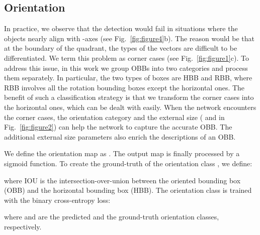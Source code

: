 \documentclass[10pt,twocolumn,letterpaper]{article}
\begin{document}
\subsection{Orientation}
\label{sub: orientation}
In practice, we observe that the detection would fail in situations where the objects nearly align with -axes (see Fig.~\ref{fig:figure4}b). The reason would be that at the boundary of the quadrant, the types of the vectors are difficult to be differentiated. We term this problem as corner cases (see Fig.~\ref{fig:figure1}c). To address this issue, in this work we group OBBs into two categories and process them separately. In particular, the two types of boxes are HBB and RBB, where RBB involves all the rotation bounding boxes except the horizontal ones. The benefit of such a classification strategy is that we transform the corner cases into the horizontal ones, which can be dealt with easily. When the network encounters the corner cases, the orientation category and the external size ( and  in Fig.~\ref{fig:figure2}) can help the network to capture the accurate OBB. The additional external size parameters also enrich the descriptions of an OBB. 

We define the orientation map as . The output map is finally processed by a sigmoid function. To create the ground-truth of the orientation class , we define:

where IOU is the intersection-over-union between the oriented bounding box (OBB) and the horizontal bounding box (HBB). The orientation class is trained with the binary cross-entropy loss:

where  and  are the predicted and the ground-truth orientation classes, respectively. 
\end{document}
